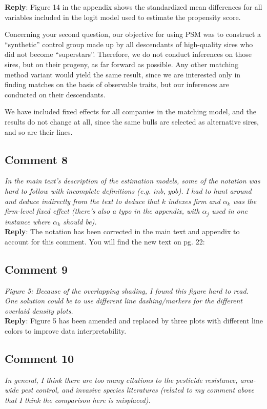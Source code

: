 \documentclass[12pt,letterpaper]{article}
\begin{document}
\textbf{Reply}: Figure 14 in the appendix shows the standardized mean differences for all variables included in the logit model used to estimate the propensity score.

Concerning your second question, our objective for using PSM was to construct a ``synthetic'' control group made up by all descendants of high-quality sires who did not become ``superstars''. Therefore, we do not conduct inferences on those sires, but on their progeny, as far forward as possible. Any other matching method variant would yield the same result, since we are interested only in finding matches on the basis of observable traits, but our inferences are conducted on their descendants.

We have included fixed effects for all companies in the matching model, and the results do not change at all, since the same bulls are selected as alternative sires, and so are their lines. 

\subsection*{Comment 8}
{\it In the main text’s description of the estimation models, some of the notation was hard to follow with incomplete definitions (e.g. $inb$, $yob$). I had to hunt around and deduce indirectly from the text to deduce that $k$ indexes firm and $\alpha_{k}$ was the firm-level fixed effect (there’s also a typo in the appendix, with $\alpha_{j}$ used in one instance where $\alpha_{k}$ should be).} \\

\textbf{Reply}: The notation has been corrected in the main text and appendix to account for this comment. You will find the new text on pg. 22:

\subsection*{Comment 9}
{\it Figure 5: Because of the overlapping shading, I found this figure hard to read. One solution could be to use different line dashing/markers for the different overlaid density plots.} \\

\textbf{Reply}: Figure 5 has been amended and replaced by three plots with different line colors to improve data interpretability.

\subsection*{Comment 10}
{\it In general, I think there are too many citations to the pesticide resistance, area-wide pest control, and invasive species literatures (related to my comment above that I think the comparison here is misplaced). } \\
\end{document}
